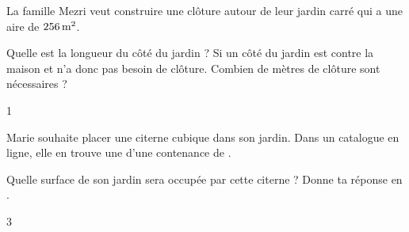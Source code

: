 \documentclass[a4paper,11pt]{report}
\begin{document}
\begin{exo}{
    La famille Mezri veut construire une clôture autour de leur jardin carré qui a une aire de $\tunit{256}{m^2}$.

    \begin{tasks}
        \task Quelle est la longueur du côté du jardin ?
        \task Si un côté du jardin est contre la maison et n'a donc pas besoin de clôture. Combien de mètres de clôture sont nécessaires ?
    \end{tasks}
}{1}    
\end{exo}

\begin{exo}{
Marie souhaite placer une citerne cubique dans son jardin. Dans un catalogue en ligne, elle en trouve une d’une contenance de .

Quelle surface de son jardin sera occupée par cette citerne ? Donne ta réponse en .
}{3}    
\end{exo}
\end{document}
